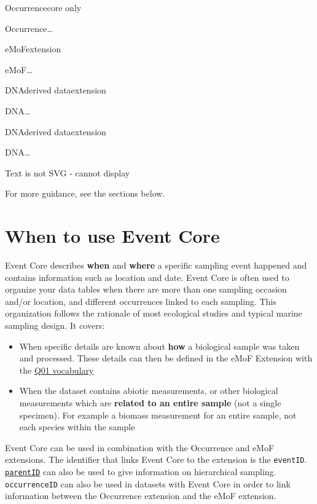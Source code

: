 \documentclass[
  letterpaper,
  DIV=11,
  numbers=noendperiod,
  oneside]{scrreprt}
\providecommand{\tightlist}{%
  \setlength{\itemsep}{0pt}\setlength{\parskip}{0pt}}\usepackage{longtable,booktabs,array}
\begin{document}
Occurrencecore only

Occurrence\ldots{}

eMoFextension

eMoF\ldots{}

DNAderived dataextension

DNA\ldots{}

DNAderived dataextension

DNA\ldots{}

Text is not SVG - cannot display

For more guidance, see the sections below.

\hypertarget{when-to-use-event-core}{%
\section{When to use Event Core}\label{when-to-use-event-core}}

Event Core describes \textbf{when} and \textbf{where} a specific
sampling event happened and contains information such as location and
date. Event Core is often used to organize your data tables when there
are more than one sampling occasion and/or location, and different
occurrences linked to each sampling. This organization follows the
rationale of most ecological studies and typical marine sampling design.
It covers:

\begin{itemize}
\tightlist
\item
  When specific details are known about \textbf{how} a biological sample
  was taken and processed. These details can then be defined in the eMoF
  Extension with the
  \href{https://www.bodc.ac.uk/resources/vocabularies/vocabulary_search/Q01/}{Q01
  vocabulary}
\item
  When the dataset contains abiotic measurements, or other biological
  measurements which are \textbf{related to an entire sample} (not a
  single specimen). For example a biomass measurement for an entire
  sample, not each species within the sample
\end{itemize}

Event Core can be used in combination with the Occurrence and eMoF
extensions. The identifier that links Event Core to the extension is the
\texttt{eventID}. \href{identifiers.html}{\texttt{parentID}} can also be
used to give information on hierarchical sampling. \texttt{occurrenceID}
can also be used in datasets with Event Core in order to link
information between the Occurrence extension and the eMoF extension.
\end{document}
